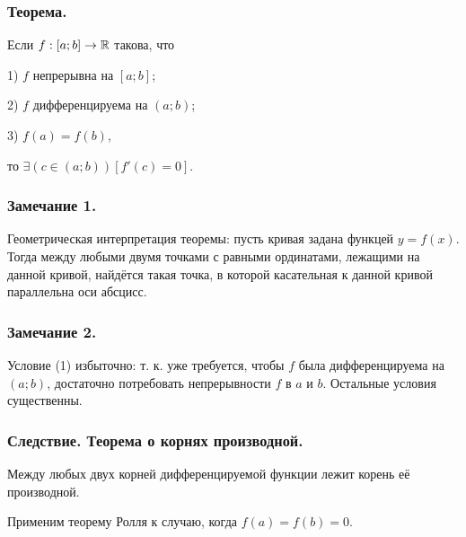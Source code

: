 \subsubsection{Теорема.}

Если $f:[a;b]\to \mathbb{R}$ такова, что

1) $f$ непрерывна на $[a;b]$;

2) $f$ дифференцируема на $(a;b)$;

3) $f(a)=f(b)$,

то $\exists(c \in (a;b))[f'(c)=0]$.

\subsubsection{Замечание 1.}

Геометрическая интерпретация теоремы: пусть кривая задана функцей $y=f(x)$.
Тогда между любыми двумя точками с равными ординатами, лежащими на данной кривой, найдётся такая точка, в которой касательная к данной кривой параллельна оси абсцисс.

\subsubsection{Замечание 2.}

Условие (1) избыточно: т. к. уже требуется, чтобы $f$ была дифференцируема на $(a;b)$, достаточно потребовать непрерывности $f$ в $a$ и $b$. Остальные условия существенны.

\subsubsection{Следствие. Теорема о корнях производной.}

Между любых двух корней дифференцируемой функции лежит корень её производной.

\dokvo

Применим теорему Ролля к случаю, когда $f(a)=f(b)=0$.





